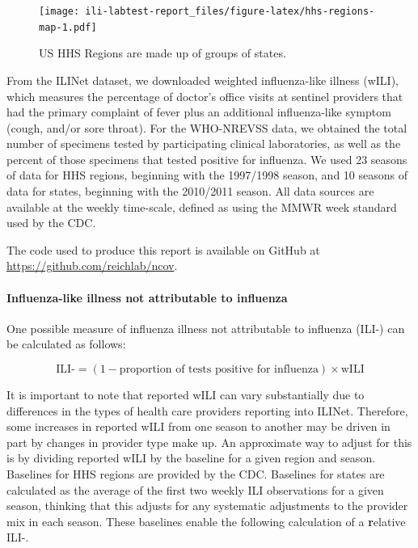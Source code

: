 \documentclass[]{article}
\let\oldparagraph\paragraph
\renewcommand{\paragraph}[1]{\oldparagraph{#1}\mbox{}}
\begin{document}
\begin{figure}
\centering
\texttt{[image: ili-labtest-report\_files/figure-latex/hhs-regions-map-1.pdf]}
\caption{\label{fig:hhs-regions-map}US HHS Regions are made up of groups
of states.}
\end{figure}

From the ILINet dataset, we downloaded weighted influenza-like illness
(wILI), which measures the percentage of doctor's office visits at
sentinel providers that had the primary complaint of fever plus an
additional influenza-like symptom (cough, and/or sore throat). For the
WHO-NREVSS data, we obtained the total number of specimens tested by
participating clinical laboratories, as well as the percent of those
specimens that tested positive for influenza. We used 23 seasons of data
for HHS regions, beginning with the 1997/1998 season, and 10 seasons of
data for states, beginning with the 2010/2011 season. All data sources
are available at the weekly time-scale, defined as using the MMWR week
standard used by the CDC.

The code used to produce this report is available on GitHub at
\url{https://github.com/reichlab/ncov}.

\hypertarget{influenza-like-illness-not-attributable-to-influenza}{%
\paragraph{Influenza-like illness not attributable to
influenza}\label{influenza-like-illness-not-attributable-to-influenza}}

One possible measure of influenza illness not attributable to influenza
(ILI-) can be calculated as follows:

\[\text{ILI-} = (1 - \text{proportion of tests positive for influenza}) \times \text{wILI}\]

It is important to note that reported wILI can vary substantially due to
differences in the types of health care providers reporting into ILINet.
Therefore, some increases in reported wILI from one season to another
may be driven in part by changes in provider type make up. An
approximate way to adjust for this is by dividing reported wILI by the
baseline for a given region and season. Baselines for HHS regions are
provided by the CDC. Baselines for states are calculated as the average
of the first two weekly ILI observations for a given season, thinking
that this adjusts for any systematic adjustments to the provider mix in
each season. These baselines enable the following calculation of a
\textbf{r}elative ILI-.
\end{document}
